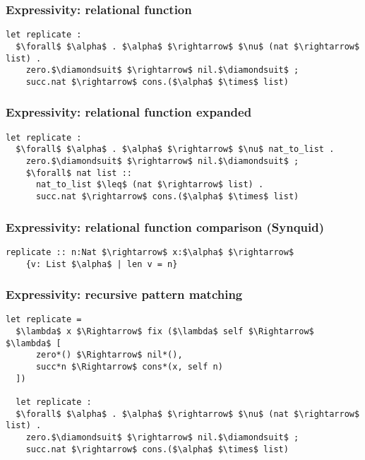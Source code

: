 \documentclass{beamer}
\begin{document}
\begin{frame}[fragile]
  \frametitle{Expressivity: relational function}

  \begin{lstlisting}[]
  let replicate : 
  $\forall$ $\alpha$ . $\alpha$ $\rightarrow$ $\nu$ (nat $\rightarrow$ list) .
    zero.$\diamondsuit$ $\rightarrow$ nil.$\diamondsuit$ ; 
    succ.nat $\rightarrow$ cons.($\alpha$ $\times$ list)
  \end{lstlisting}


\end{frame}

\begin{frame}[fragile]

  \frametitle{Expressivity: relational function expanded}

  \begin{lstlisting}[]
  let replicate : 
  $\forall$ $\alpha$ . $\alpha$ $\rightarrow$ $\nu$ nat_to_list .
    zero.$\diamondsuit$ $\rightarrow$ nil.$\diamondsuit$ ; 
    $\forall$ nat list :: 
      nat_to_list $\leq$ (nat $\rightarrow$ list) .
      succ.nat $\rightarrow$ cons.($\alpha$ $\times$ list)
  \end{lstlisting}

\end{frame}

\begin{frame}[fragile]

  \frametitle{Expressivity: relational function comparison (Synquid)}

  \begin{lstlisting}[keywords={termination, measure, data, where}]
  replicate :: n:Nat $\rightarrow$ x:$\alpha$ $\rightarrow$ 
    {v: List $\alpha$ | len v = n}

  \end{lstlisting}

  \hfill
\end{frame}

\begin{frame}[fragile]
  \frametitle{Expressivity: recursive pattern matching}
  \begin{lstlisting}[]
  let replicate = 
  $\lambda$ x $\Rightarrow$ fix ($\lambda$ self $\Rightarrow$ $\lambda$ [
      zero*() $\Rightarrow$ nil*(),
      succ*n $\Rightarrow$ cons*(x, self n)
  ])

  let replicate : 
  $\forall$ $\alpha$ . $\alpha$ $\rightarrow$ $\nu$ (nat $\rightarrow$ list) .
    zero.$\diamondsuit$ $\rightarrow$ nil.$\diamondsuit$ ; 
    succ.nat $\rightarrow$ cons.($\alpha$ $\times$ list)
  \end{lstlisting}
\end{frame}
\end{document}

